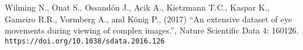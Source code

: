 \documentclass[11pt]{article}
\begin{document}
\begin{thebibliography}{99}

     Wilming N., Onat S., Ossandón J., Acik A., Kietzmann
    T.C., Kaspar K., Gameiro R.R., Vormberg A., and König P., (2017)
    ``An extensive dataset of eye movements during viewing of complex
    images.'', Nature Scientific Data 4: 160126.  \verb|https://doi.org/10.1038/sdata.2016.126|

\end{thebibliography}
\end{document}
